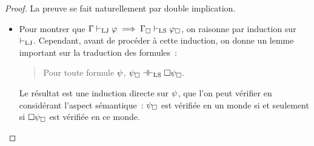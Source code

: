 \begin{proof}
  La preuve se fait naturellement par double implication.

  \begin{itemize}
  \item Pour montrer que
    $\Gamma\vdash_{\operatorname{LJ}}\varphi\implies\Gamma_{\mathbin{\square}}\vdash_{\operatorname{LS}}\varphi_{\mathbin{\square}}$, on
    raisonne par induction sur $\vdash_{\operatorname{LJ}}$. Cependant, avant de procéder à cette
    induction, on donne un lemme important sur la traduction des formules~:
    \begin{quotation}
      \noindent
      Pour toute formule $\psi$, $\psi_{\mathbin{\square}}\mathrel{\mathord{\dashv}\mathord{\vdash}_{\operatorname{LS}}}\mathbin{\square}\psi_{\mathbin{\square}}$.
    \end{quotation}
    Le résultat est une induction directe sur $\psi$, que l'on peut vérifier
    en considérant l'aspect sémantique~: $\psi_{\mathbin{\square}}$ est vérifiée en un
    monde si et seulement si $\mathbin{\square}\psi_{\mathbin{\square}}$ est vérifiée en ce monde.


\end{itemize}
\end{proof}
